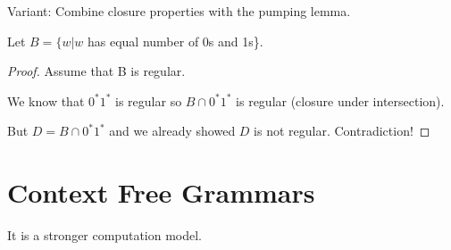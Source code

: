 Variant: Combine closure properties with the pumping lemma.

\begin{eg}
    Let \(B = \{ w | w \)  has equal number of 0s and 1s\}.
\end{eg}
\begin{proof}
    Assume that B is regular.

    We know that \(0^*1^*\) is regular so  \(B \cap 0^*1^*\) is regular (closure under intersection). 

    But \(D = B \cap 0^*1^*\) and we already showed \(D\) is not regular. Contradiction!
\end{proof}


\section{Context Free Grammars}

It is a stronger computation model.



